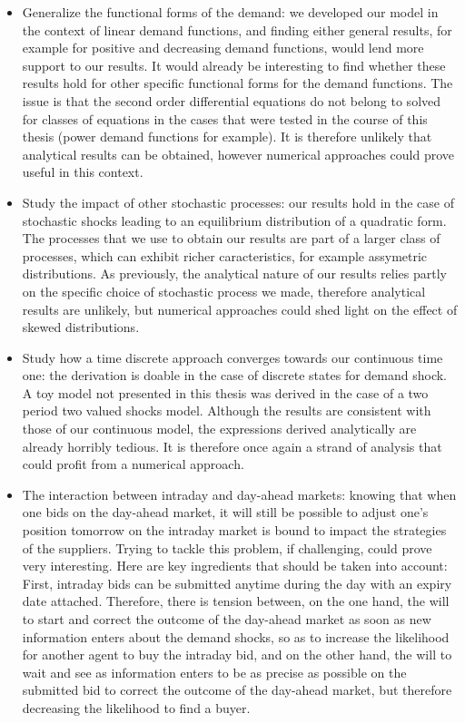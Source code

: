 \begin{itemize}
\item Generalize the functional forms of the demand: we developed our model in the context of linear demand functions, and finding either general results, for example for positive and decreasing demand functions, would lend more support to our results. It would already be interesting to find whether these results hold for other specific functional forms for the demand functions. The issue is that the second order differential equations do not belong to solved for classes of equations in the cases that were tested in the course of this thesis (power demand functions for example). It is therefore unlikely that analytical results can be obtained, however numerical approaches could prove useful in this context. 

\item Study the impact of other stochastic processes: our results hold in the case of stochastic shocks leading to an equilibrium distribution of a quadratic form. The processes that we use to obtain our results are part of a larger class of processes, which can exhibit richer caracteristics, for example assymetric distributions. As previously, the analytical nature of our results relies partly on the specific choice of stochastic process we made, therefore analytical results are unlikely, but numerical approaches could shed light on the effect of skewed distributions.

\item Study how a time discrete approach converges towards our continuous time one: the derivation is doable in the case of discrete states for demand shock. A toy model not presented in this thesis was derived in the case of a two period two valued shocks model. Although the results are consistent with those of our continuous model, the expressions derived analytically are already horribly tedious. It is therefore once again a strand of analysis that could profit from a numerical approach.

\item The interaction between intraday and day-ahead markets: knowing that when one bids on the day-ahead market, it will still be possible to adjust one's position tomorrow on the intraday market is bound to impact the strategies of the suppliers. Trying to tackle this problem, if challenging, could prove very interesting. Here are key ingredients that should be taken into account: \\

First, intraday bids can be submitted anytime during the day with an expiry date attached. Therefore, there is tension between, on the one hand, the will to start and correct the outcome of the day-ahead market as soon as new information enters about the demand shocks, so as to increase the likelihood for another agent to buy the intraday bid, and on the other hand, the will to wait and see as information enters to be as precise as possible on the submitted bid to correct the outcome of the day-ahead market, but therefore decreasing the likelihood to find a buyer. \\


\end{itemize}
